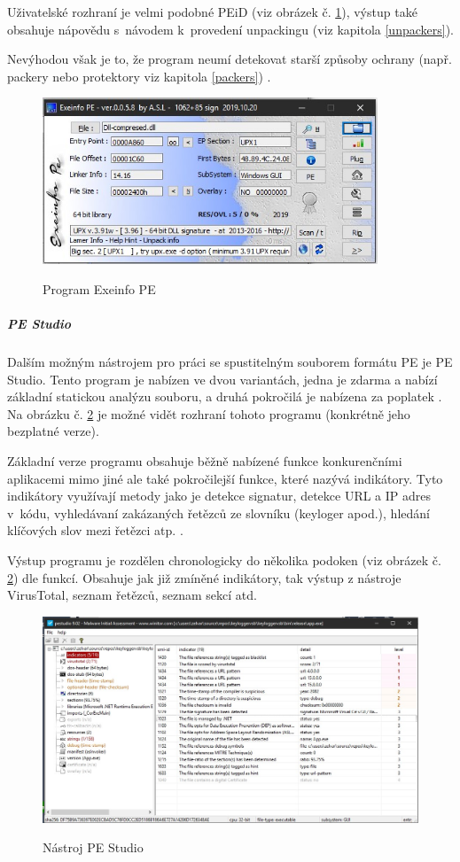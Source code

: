 Uživatelské rozhraní je velmi podobné PEiD (viz obrázek č. \ref{fig:exeinfo}), výstup také obsahuje nápovědu s~návodem k~provedení unpackingu (viz kapitola \ref{unpackers}).

Nevýhodou však je to, že program neumí detekovat starší způsoby ochrany (např. packery nebo protektory viz kapitola \ref{packers}) \cite{exeinfo_malwarebytes}.

\begin{figure}[!ht]
    \centering
    \caption{Program Exeinfo PE}
    \includegraphics[width=100mm,scale=0.5]{Figures/obrazky/Exeinfo.jpg}
    \label{fig:exeinfo}
\end{figure}


\subparagraph*{PE Studio}

Dalším možným nástrojem pro práci se spustitelným souborem formátu PE je PE Studio. Tento program je nabízen ve dvou variantách, jedna je zdarma a nabízí základní statickou analýzu souboru, a druhá pokročilá je nabízena za poplatek \cite{pestudio}. Na obrázku č. \ref{fig:pestudio} je možné vidět rozhraní tohoto programu (konkrétně jeho bezplatné verze).

Základní verze programu obsahuje běžně nabízené funkce konkurenčními aplikacemi mimo jiné ale také pokročilejší funkce, které nazývá indikátory. Tyto indikátory využívají metody jako je detekce signatur, detekce URL a IP adres v~kódu, vyhledávaní zakázaných řetězců ze slovníku (keyloger apod.), hledání klíčových slov mezi řetězci atp. \cite{exeinfo_malwarebytes}.

Výstup programu je rozdělen chronologicky do několika podoken (viz obrázek č. \ref{fig:pestudio}) dle funkcí. Obsahuje jak již zmíněné indikátory, tak výstup z nástroje VirusTotal, seznam řetězců, seznam sekcí atd.

\begin{figure}[!ht]
    \centering
    \caption{Nástroj PE Studio}
    \includegraphics[width=160mm,scale=1]{Figures/obrazky/PeStudio.jpg}
    \label{fig:pestudio}
\end{figure}